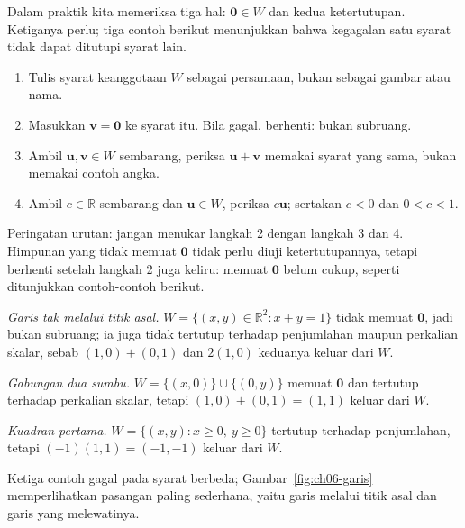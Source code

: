 Dalam praktik kita memeriksa tiga hal: $\mathbf{0}\in W$ dan kedua ketertutupan. Ketiganya
perlu; tiga contoh berikut menunjukkan bahwa kegagalan satu syarat tidak dapat ditutupi
syarat lain.
\begin{resep}
\begin{enumerate}
  \item Tulis syarat keanggotaan $W$ sebagai persamaan, bukan sebagai gambar atau nama.
  \item Masukkan $\mathbf{v}=\mathbf{0}$ ke syarat itu. Bila gagal, berhenti: bukan subruang.
  \item Ambil $\mathbf{u},\mathbf{v}\in W$ sembarang, periksa $\mathbf{u}+\mathbf{v}$ memakai
        syarat yang sama, bukan memakai contoh angka.
  \item Ambil $c\in\mathbb{R}$ sembarang dan $\mathbf{u}\in W$, periksa $c\mathbf{u}$; sertakan
        $c<0$ dan $0<c<1$.
\end{enumerate}
Peringatan urutan: jangan menukar langkah 2 dengan langkah 3 dan 4. Himpunan yang tidak memuat
$\mathbf{0}$ tidak perlu diuji ketertutupannya, tetapi berhenti setelah langkah 2 juga keliru:
memuat $\mathbf{0}$ belum cukup, seperti ditunjukkan contoh-contoh berikut.
\end{resep}


\emph{Garis tak melalui titik asal.} $W=\{(x,y)\in\mathbb{R}^{2}:x+y=1\}$ tidak memuat
$\mathbf{0}$, jadi bukan subruang; ia juga tidak tertutup terhadap penjumlahan maupun
perkalian skalar, sebab $(1,0)+(0,1)$ dan $2(1,0)$ keduanya keluar dari $W$.

\emph{Gabungan dua sumbu.} $W=\{(x,0)\}\cup\{(0,y)\}$ memuat $\mathbf{0}$ dan tertutup
terhadap perkalian skalar, tetapi $(1,0)+(0,1)=(1,1)$ keluar dari $W$.

\emph{Kuadran pertama.} $W=\{(x,y):x\ge 0,\ y\ge 0\}$ tertutup terhadap penjumlahan,
tetapi $(-1)(1,1)=(-1,-1)$ keluar dari $W$.

Ketiga contoh gagal pada syarat berbeda; Gambar~\ref{fig:ch06-garis} memperlihatkan pasangan
paling sederhana, yaitu garis melalui titik asal dan garis yang melewatinya.

